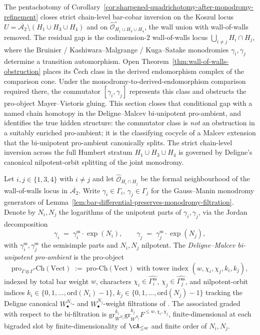 The pentachotomy of
Corollary~\textup{\ref{cor:sharpened-quadrichotomy-after-monodromy-refinement}}
closes strict chain-level bar-cobar inversion on the Koszul locus
$U = \overline{\mathcal{A}_2}\setminus(H_1\cup H_3\cup H_4)$ and on
$\widehat{\mathcal{O}}^{\circ}_{H_1\cup H_3\cup H_4}$, the wall union
with wall-of-walls removed. The residual gap is the codimension-$2$
wall-of-walls locus $\bigcup_{i\neq j} H_i\cap H_j$, where the
Bruinier / Kashiwara--Malgrange / Kuga--Satake monodromies
$\gamma_i,\gamma_j$ determine a transition automorphism.  Open
Theorem~\textup{\ref{thm:wall-of-walls-obstruction}} places its
\v Cech class in the derived endomorphism complex of the comparison
cone.  Under the monodromy-to-derived-endomorphism comparison required
there, the commutator $[\gamma_i,\gamma_j]$ represents this class and
obstructs the pro-object Mayer--Vietoris gluing. This section closes
that conditional gap with
a named chain homotopy in the Deligne--Malcev bi-unipotent pro-ambient,
and identifies the true hidden structure: the commutator class is
\emph{not} an obstruction in a suitably enriched pro-ambient; it is
the classifying cocycle of a Malcev extension that the bi-unipotent
pro-ambient canonically splits. The strict chain-level inversion
across the full Humbert stratum $H_1\cup H_3\cup H_4$ is governed by
Deligne's canonical nilpotent-orbit splitting of the joint monodromy.

\begin{definition}
\label{def:deligne-malcev-bi-unipotent-ambient}
%
%
Let $i,j\in\{1,3,4\}$ with $i\neq j$ and let
$\widehat{\mathcal{O}}_{H_i\cap H_j}$ be the formal neighbourhood of
the wall-of-walls locus in $\overline{\mathcal{A}_2}$. Write
$\gamma_i\in\Gamma_i$, $\gamma_j\in\Gamma_j$ for the Gauss--Manin
monodromy generators of
Lemma~\textup{\ref{lem:bar-differential-preserves-monodromy-filtration}}.
Denote by $N_i,N_j$ the logarithms of the unipotent parts of
$\gamma_i,\gamma_j$, via the Jordan decomposition
\[
\gamma_i \;=\; \gamma_i^{\mathrm{ss}}\cdot \exp(N_i),
\qquad
\gamma_j \;=\; \gamma_j^{\mathrm{ss}}\cdot \exp(N_j),
\]
with $\gamma_i^{\mathrm{ss}},\gamma_j^{\mathrm{ss}}$ the semisimple
parts and $N_i,N_j$ nilpotent. The \emph{Deligne--Malcev bi-unipotent
pro-ambient} is the pro-object
\[
\mathrm{pro}_{\Gamma\otimes\Gamma}\text{-}\mathrm{Ch}(\mathrm{Vect})
\;:=\;
\mathrm{pro}\text{-}\mathrm{Ch}(\mathrm{Vect})
\text{ with tower index }
(w,\chi_i,\chi_j,k_i,k_j),
\]
indexed by total bar weight $w$, characters
$\chi_i\in\widehat{\Gamma_i^{\mathrm{ss}}}$,
$\chi_j\in\widehat{\Gamma_j^{\mathrm{ss}}}$, and nilpotent-orbit
indices $k_i\in\{0,1,\ldots,\mathrm{ord}(N_i)-1\}$,
$k_j\in\{0,1,\ldots,\mathrm{ord}(N_j)-1\}$ tracking the Deligne canonical
$W^{N_i}_\bullet$- and $W^{N_j}_\bullet$-weight filtrations of
\cite{Schmid1973,Deligne1970}. The associated graded with respect to
the bi-filtration is
$\mathrm{gr}^{k_i}_{W^{N_i}}\mathrm{gr}^{k_j}_{W^{N_j}}
F^{\leq w,\chi_i,\chi_j}$, finite-dimensional at each bigraded slot by
finite-dimensionality of $\cA_{\leq w}$ and finite order of $N_i,N_j$.
\end{definition}

